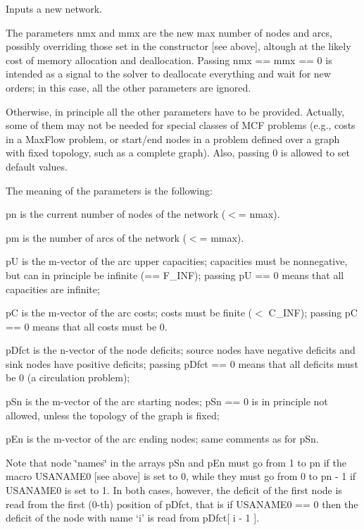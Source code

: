 Inputs a new network.

The parameters nmx and mmx are the new max number of nodes and arcs, possibly overriding those set in the constructor \mbox{[}see above\mbox{]}, altough at the likely cost of memory allocation and deallocation. Passing nmx == mmx == 0 is intended as a signal to the solver to deallocate everything and wait for new orders; in this case, all the other parameters are ignored.

Otherwise, in principle all the other parameters have to be provided. Actually, some of them may not be needed for special classes of M\+CF problems (e.\+g., costs in a Max\+Flow problem, or start/end nodes in a problem defined over a graph with fixed topology, such as a complete graph). Also, passing 0 is allowed to set default values.

The meaning of the parameters is the following\+:


\begin{DoxyItemize}
\item pn is the current number of nodes of the network ($<$= nmax).
\item pm is the number of arcs of the network ($<$= mmax).
\item pU is the m-\/vector of the arc upper capacities; capacities must be nonnegative, but can in principle be infinite (== F\+\_\+\+I\+NF); passing pU == 0 means that all capacities are infinite;
\item pC is the m-\/vector of the arc costs; costs must be finite ($<$ C\+\_\+\+I\+NF); passing pC == 0 means that all costs must be 0.
\item p\+Dfct is the n-\/vector of the node deficits; source nodes have negative deficits and sink nodes have positive deficits; passing p\+Dfct == 0 means that all deficits must be 0 (a circulation problem);
\item p\+Sn is the m-\/vector of the arc starting nodes; p\+Sn == 0 is in principle not allowed, unless the topology of the graph is fixed;
\item p\+En is the m-\/vector of the arc ending nodes; same comments as for p\+Sn.
\end{DoxyItemize}

Note that node \char`\"{}names\char`\"{} in the arrays p\+Sn and p\+En must go from 1 to pn if the macro U\+S\+A\+N\+A\+M\+E0 \mbox{[}see above\mbox{]} is set to 0, while they must go from 0 to pn -\/ 1 if U\+S\+A\+N\+A\+M\+E0 is set to 1. In both cases, however, the deficit of the first node is read from the first (0-\/th) position of p\+Dfct, that is if U\+S\+A\+N\+A\+M\+E0 == 0 then the deficit of the node with name `i' is read from p\+Dfct\mbox{[} i -\/ 1 \mbox{]}.

